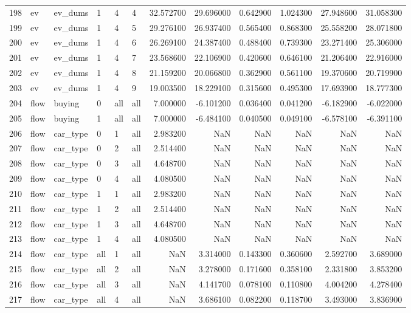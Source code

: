 \begin{tabular}{llllllrrrrrr}
198 & ev & ev_dums & 1 & 4 & 4 & 32.572700 & 29.696000 & 0.642900 & 1.024300 & 27.948600 & 31.058300 \\
199 & ev & ev_dums & 1 & 4 & 5 & 29.276100 & 26.937400 & 0.565400 & 0.868300 & 25.558200 & 28.071800 \\
200 & ev & ev_dums & 1 & 4 & 6 & 26.269100 & 24.387400 & 0.488400 & 0.739300 & 23.271400 & 25.306000 \\
201 & ev & ev_dums & 1 & 4 & 7 & 23.568600 & 22.106900 & 0.420600 & 0.646100 & 21.206400 & 22.916000 \\
202 & ev & ev_dums & 1 & 4 & 8 & 21.159200 & 20.066800 & 0.362900 & 0.561100 & 19.370600 & 20.719900 \\
203 & ev & ev_dums & 1 & 4 & 9 & 19.003500 & 18.229100 & 0.315600 & 0.495300 & 17.693900 & 18.777300 \\
204 & flow & buying & 0 & all & all & 7.000000 & -6.101200 & 0.036400 & 0.041200 & -6.182900 & -6.022000 \\
205 & flow & buying & 1 & all & all & 7.000000 & -6.484100 & 0.040500 & 0.049100 & -6.578100 & -6.391100 \\
206 & flow & car_type & 0 & 1 & all & 2.983200 & NaN & NaN & NaN & NaN & NaN \\
207 & flow & car_type & 0 & 2 & all & 2.514400 & NaN & NaN & NaN & NaN & NaN \\
208 & flow & car_type & 0 & 3 & all & 4.648700 & NaN & NaN & NaN & NaN & NaN \\
209 & flow & car_type & 0 & 4 & all & 4.080500 & NaN & NaN & NaN & NaN & NaN \\
210 & flow & car_type & 1 & 1 & all & 2.983200 & NaN & NaN & NaN & NaN & NaN \\
211 & flow & car_type & 1 & 2 & all & 2.514400 & NaN & NaN & NaN & NaN & NaN \\
212 & flow & car_type & 1 & 3 & all & 4.648700 & NaN & NaN & NaN & NaN & NaN \\
213 & flow & car_type & 1 & 4 & all & 4.080500 & NaN & NaN & NaN & NaN & NaN \\
214 & flow & car_type & all & 1 & all & NaN & 3.314000 & 0.143300 & 0.360600 & 2.592700 & 3.689000 \\
215 & flow & car_type & all & 2 & all & NaN & 3.278000 & 0.171600 & 0.358100 & 2.331800 & 3.853200 \\
216 & flow & car_type & all & 3 & all & NaN & 4.141700 & 0.078100 & 0.110800 & 4.004200 & 4.278400 \\
217 & flow & car_type & all & 4 & all & NaN & 3.686100 & 0.082200 & 0.118700 & 3.493000 & 3.836900 \\

\end{tabular}

